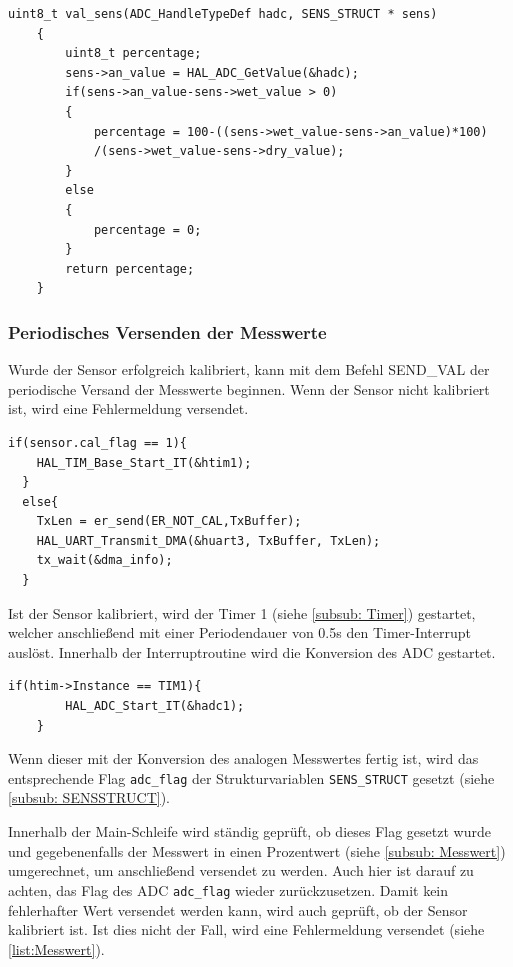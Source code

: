   \begin{lstlisting}[caption={\textit{Berechnung des Messwerts}}]
    uint8_t val_sens(ADC_HandleTypeDef hadc, SENS_STRUCT * sens)
    {
        uint8_t percentage;
        sens->an_value = HAL_ADC_GetValue(&hadc);
        if(sens->an_value-sens->wet_value > 0)										
        {
            percentage = 100-((sens->wet_value-sens->an_value)*100)
            /(sens->wet_value-sens->dry_value);
        }
        else
        {
            percentage = 0;
        }
        return percentage;
    }
  \end{lstlisting}

\newpage

\subsubsection{Periodisches Versenden der Messwerte}

Wurde der Sensor erfolgreich kalibriert, kann mit dem Befehl SEND\_VAL der periodische Versand der Messwerte beginnen. Wenn der Sensor nicht
kalibriert ist, wird eine Fehlermeldung versendet.

\begin{lstlisting}[caption={\textit{Periodisches Versenden von Messwerten}}]
  if(sensor.cal_flag == 1){
    HAL_TIM_Base_Start_IT(&htim1);
  }
  else{
    TxLen = er_send(ER_NOT_CAL,TxBuffer);
    HAL_UART_Transmit_DMA(&huart3, TxBuffer, TxLen);
    tx_wait(&dma_info);
  }
\end{lstlisting}

Ist der Sensor kalibriert, wird der Timer 1 (siehe \ref{subsub: Timer}) gestartet, welcher anschließend mit einer Periodendauer von 0.5s den Timer-Interrupt
auslöst. Innerhalb der Interruptroutine wird die Konversion des \ac{ADC} gestartet.
\begin{lstlisting}[caption={\textit{ADC Start}}]
	if(htim->Instance == TIM1){
		HAL_ADC_Start_IT(&hadc1);
	}  
\end{lstlisting}

Wenn dieser mit der Konversion des analogen Messwertes fertig ist, wird das entsprechende Flag \lstinline!adc_flag! der Strukturvariablen \lstinline{SENS_STRUCT} 
gesetzt (siehe \ref{subsub: SENSSTRUCT}).

\smallskip

Innerhalb der Main-Schleife wird ständig geprüft, ob dieses Flag gesetzt wurde und gegebenenfalls der Messwert in einen Prozentwert (siehe \ref{subsub: Messwert}) umgerechnet,
um anschließend versendet zu werden. Auch hier ist darauf zu achten, das Flag des \ac{ADC} \lstinline!adc_flag! wieder zurückzusetzen. Damit kein fehlerhafter Wert
versendet werden kann, wird auch geprüft, ob der Sensor kalibriert ist. Ist dies nicht der Fall, wird eine Fehlermeldung versendet (siehe \ref{list:Messwert}).

